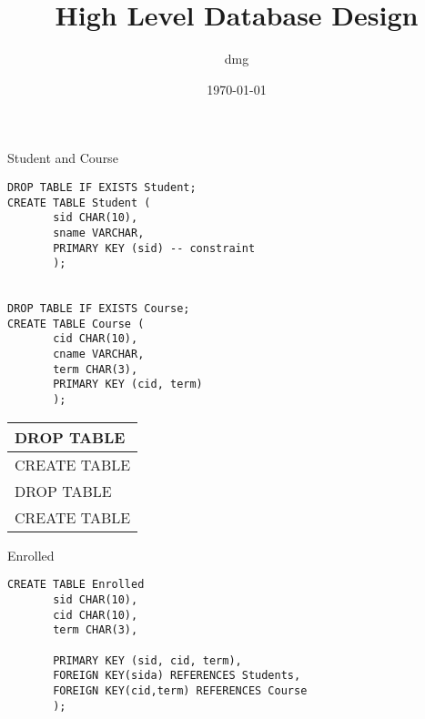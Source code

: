 \documentclass[presentation]{beamer}
\author{dmg}
\date{\today}
\title{High Level Database Design}
\begin{document}
\maketitle

\begin{frame}[fragile,label={sec:org4fd63fb}]{Student and Course}
 \begin{verbatim}
DROP TABLE IF EXISTS Student; 
CREATE TABLE Student (
       sid CHAR(10),
       sname VARCHAR,
       PRIMARY KEY (sid) -- constraint
       );


DROP TABLE IF EXISTS Course; 
CREATE TABLE Course (
       cid CHAR(10),
       cname VARCHAR,
       term CHAR(3),
       PRIMARY KEY (cid, term)
       );
\end{verbatim}

\begin{center}
\begin{tabular}{l}
DROP TABLE\\
\hline
CREATE TABLE\\
DROP TABLE\\
CREATE TABLE\\
\end{tabular}
\end{center}
\end{frame}

\begin{frame}[fragile,label={sec:orgd891aff}]{Enrolled}
 \begin{verbatim}
CREATE TABLE Enrolled
       sid CHAR(10),
       cid CHAR(10),
       term CHAR(3),

       PRIMARY KEY (sid, cid, term),
       FOREIGN KEY(sida) REFERENCES Students,
       FOREIGN KEY(cid,term) REFERENCES Course
       );
\end{verbatim}
\end{frame}
\end{document}

